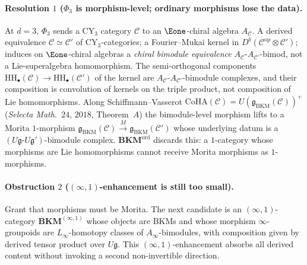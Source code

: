 \paragraph{Resolution \texorpdfstring{$1$}{1} (\texorpdfstring{$\Phi_3$}{Phi-3} is morphism-level; ordinary morphisms
lose the data).}
At $d=3$, $\Phi_3$ sends a CY$_3$ category $\mathcal C$ to an
$\Eone$-chiral algebra $A_{\mathcal C}$. A derived equivalence
$\mathcal C\simeq\mathcal C'$ of CY$_3$-categories; a
Fourier--Mukai kernel in
$D^b(\mathcal C^{\mathrm{op}}\otimes\mathcal C')$; induces on
$\Eone$-chiral algebras a \emph{chiral bimodule equivalence}
$A_{\mathcal C}\text{-}A_{\mathcal C'}$-bimod, not a
Lie-superalgebra homomorphism. The semi-orthogonal components
$\mathrm{HH}_\bullet(\mathcal C)\to\mathrm{HH}_\bullet(\mathcal C')$
of the kernel are $A_{\mathcal C}$-$A_{\mathcal C'}$-bimodule
complexes, and their composition is convolution of kernels on the
triple product, not composition of Lie homomorphisms. Along
Schiffmann--Vasserot
$\mathrm{CoHA}(\mathcal C)=U(\mathfrak g_{\mathrm{BKM}}(\mathcal C))^+$
(\emph{Selecta Math.}\ $24$, $2018$, Theorem~$A$) the bimodule-level
morphism lifts to a Morita $1$-morphism
$\mathfrak g_{\mathrm{BKM}}(\mathcal C)\xrightarrow{M}
\mathfrak g_{\mathrm{BKM}}(\mathcal C')$ whose underlying datum is
a $(U\mathfrak g\text{-}U\mathfrak g')$-bimodule complex.
$\mathbf{BKM}^{\mathrm{ord}}$ discards this: a $1$-category whose
morphisms are Lie homomorphisms cannot receive Morita morphisms as
$1$-morphisms.

\paragraph{Obstruction \texorpdfstring{$2$}{2} (\texorpdfstring{$(\infty,1)$}{(inf,1)}-enhancement is still too small).}
Grant that morphisms must be Morita. The next candidate is an
$(\infty,1)$-category $\mathbf{BKM}^{(\infty,1)}$ whose objects are
BKMs and whose morphism $\infty$-groupoids are $L_\infty$-homotopy
classes of $A_\infty$-bimodules, with composition given by derived
tensor product over $U\mathfrak g$. This
$(\infty,1)$-enhancement absorbs all derived content without
invoking a second non-invertible direction.


